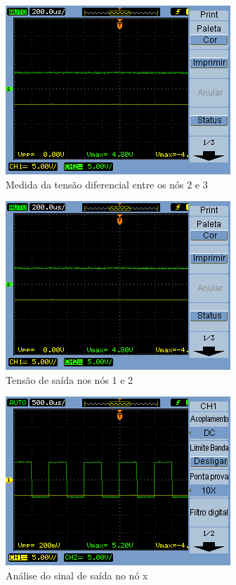 \documentclass[a4paper]{article} %
\begin{document}
\begin{figure}[h!]
\begin{centering}
\includegraphics[scale=0.7]{Imagens/3.4duplicador_tensao/423} \caption{Medida da tensão diferencial entre os nós 2 e 3 \label{fig:Fig-45}}
\par\end{centering}
\end{figure}


\newpage
\begin{figure}[h!]
\begin{centering}
\includegraphics[scale=0.7]{Imagens/3.4duplicador_tensao/423} \caption{Tensão de saída nos nós 1 e 2 \label{fig:q4-no12}}
\par\end{centering}
\end{figure}


\begin{figure}[h!]
\begin{centering}
\includegraphics[scale=0.7]{Imagens/3.4duplicador_tensao/444} \caption{Análise do sinal de saída no nó x \label{fig:q4-no}}
\par\end{centering}
\end{figure}
\end{document}
